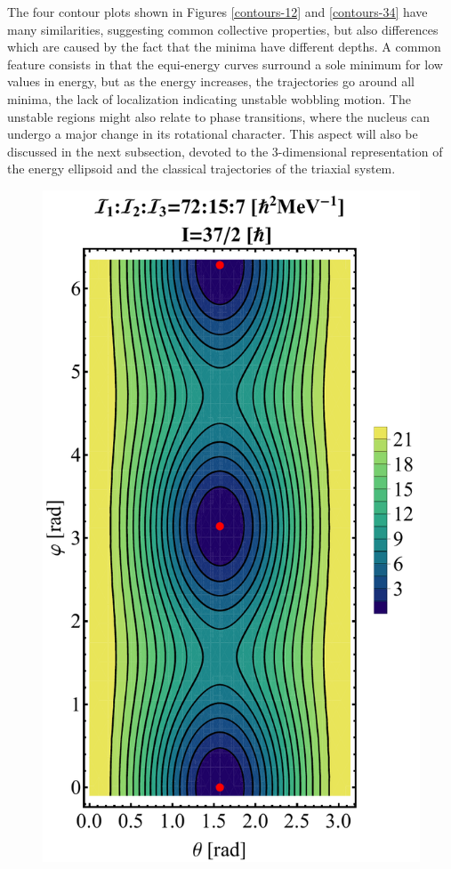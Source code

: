 \documentclass[myclassdoc,debug]{rjparticle}
\begin{document}
The four contour plots shown in Figures \ref{contours-12} and \ref{contours-34} have many similarities, suggesting common collective properties, but also differences which are caused by the fact that the minima have different depths. A common feature consists in that the equi-energy curves surround a sole minimum for low values in energy, but as the energy increases, the trajectories go around all minima, the lack of localization indicating unstable wobbling motion. The unstable regions might also relate to phase transitions, where the nucleus can undergo a major change in its rotational character. This aspect will also be discussed in the next subsection, devoted to the 3-dimensional representation of the energy ellipsoid and the classical trajectories of the triaxial system.

\begin{figure}
\centering
\begin{minipage}{.5\textwidth}
  \centering
  \includegraphics[scale=0.2]{figs/contour-tsd3.pdf}

\end{minipage}
\end{figure}
\end{document}
